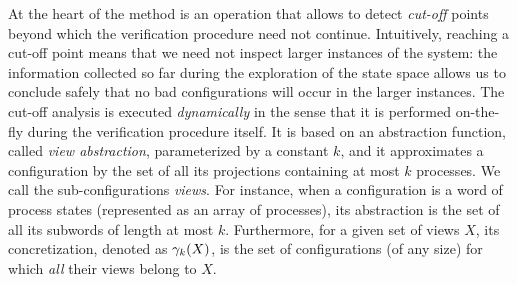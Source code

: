 At the heart of the method is an operation that allows to detect {\it
  cut-off} points beyond which the verification procedure need not
continue.
%
Intuitively, reaching a cut-off point means that we need not inspect %
larger instances of the system: the information collected so far
during the exploration of the state space allows us to conclude safely
that no bad configurations will occur in the larger instances.
%
The cut-off analysis is executed {\it dynamically} in the sense that
it is performed on-the-fly during the verification procedure itself.
%
It is based on an abstraction function, called {\it view abstraction},
parameterized by a constant $k$, and it approximates a
configuration %
by the set of all its projections containing at most
$k$ processes. We call the sub-configurations {\it views}.
%
For instance, when a configuration is a word of process states
(represented as an array of processes), its abstraction is the set of
all its subwords of length at most $k$.
%
Furthermore, for a given set of views $X$, its concretization, denoted
as $\gamma_{k} (X)$, is the set of configurations (of any size) for which {\it all}
their views belong to $X$.


